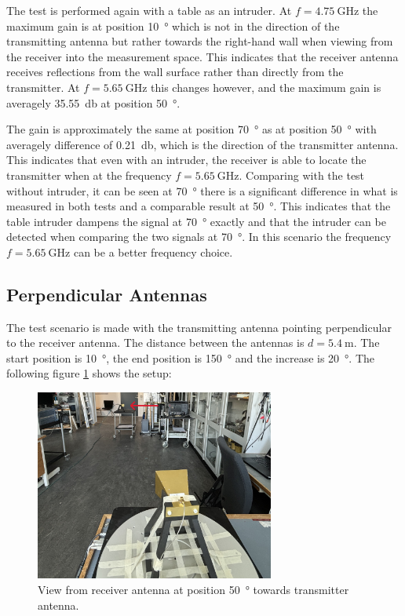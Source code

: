 The test is performed again with a table as an intruder. At $f=\SI{4.75}{\giga\hertz}$ the maximum gain is at position \SI{10}{\degree} which is not in the direction of the transmitting antenna but rather towards the right-hand wall when viewing from the receiver into the measurement space. This indicates that the receiver antenna receives reflections from the wall surface rather than directly from the transmitter. At $f=\SI{5.65}{\giga\hertz}$ this changes however, and the maximum gain is averagely \SI{35.55}{\decibel} at position \SI{50}{\degree}. 

The gain is approximately the same at position \SI{70}{\degree} as at position \SI{50}{\degree} with averagely difference of \SI{0.21}{\decibel}, which is the direction of the transmitter antenna. This indicates that even with an intruder, the receiver is able to locate the transmitter when at the frequency $f=\SI{5.65}{\giga\hertz}$. Comparing with the test without intruder, it can be seen at \SI{70}{\degree} there is a significant difference in what is measured in both tests and a comparable result at \SI{50}{\degree}. This indicates that the table intruder dampens the signal at \SI{70}{\degree} exactly and that the intruder can be detected when comparing the two signals at \SI{70}{\degree}. In this scenario the frequency $f=\SI{5.65}{\giga\hertz}$ can be a better frequency choice.

\subsection{Perpendicular Antennas}
The test scenario is made with the transmitting antenna pointing perpendicular to the receiver antenna. The distance between the antennas is $d=\SI{5.4}{\meter}$. The start position is \SI{10}{\degree}, the end position is \SI{150}{\degree} and the increase is \SI{20}{\degree}. The following figure \ref{fig:a2_3} shows the setup:
\begin{figure}[H]
    \centering
    \includegraphics[width=0.7\textwidth]{figures/test_los_perpendicular.JPG}
    \caption{View from receiver antenna at position \SI{50}{\degree} towards transmitter antenna.} \label{fig:a2_3}
\end{figure}

